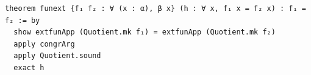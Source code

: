 \documentclass{article}
\begin{document}
\begin{lstlisting}
theorem funext {f₁ f₂ : ∀ (x : α), β x} (h : ∀ x, f₁ x = f₂ x) : f₁ = f₂ := by
  show extfunApp (Quotient.mk f₁) = extfunApp (Quotient.mk f₂)
  apply congrArg
  apply Quotient.sound
  exact h
\end{lstlisting}
\end{document}
